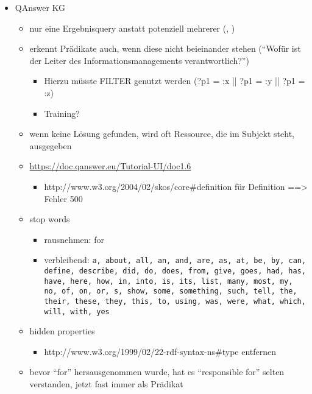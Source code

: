 \begin{itemize}
  \item QAnswer KG
  \begin{itemize}
    \item nur eine Ergebnisquery anstatt potenziell mehrerer (, )
    \item erkennt Prädikate auch, wenn diese nicht beieinander stehen (\enquote{Wofür ist der Leiter des Informationsmanagements verantwortlich?})
    \begin{itemize}
      \item Hierzu müsste FILTER genutzt werden (?p1 = :x || ?p1 = :y || ?p1 = :z)
      \item Training?
    \end{itemize}
    \item wenn keine Lösung gefunden, wird oft Ressource, die im Subjekt steht, ausgegeben
    \item \url{https://doc.qanswer.eu/Tutorial-UI/doc1.6}
    \begin{itemize}
      \item http://www.w3.org/2004/02/skos/core\#definition für Definition ==> Fehler 500
    \end{itemize}
    \item stop words
    \begin{itemize}
      \item rausnehmen: for
      \item verbleibend: \texttt{a, about, all, an, and, are, as, at, be, by, can, define, describe, did, do, does, from, give, goes, had, has, have, here, how, in, into, is, its, list, many, most, my, no, of, on, or, s, show, some, something, such, tell, the, their, these, they, this, to, using, was, were, what, which, will, with, yes}
    \end{itemize}
    \item hidden properties
    \begin{itemize}
      \item http://www.w3.org/1999/02/22-rdf-syntax-ns\#type entfernen
    \end{itemize}
    \item bevor \enquote{for} hersausgenommen wurde, hat es \enquote{responsible for} selten verstanden, jetzt fast immer als Prädikat
  \end{itemize}
\end{itemize}
